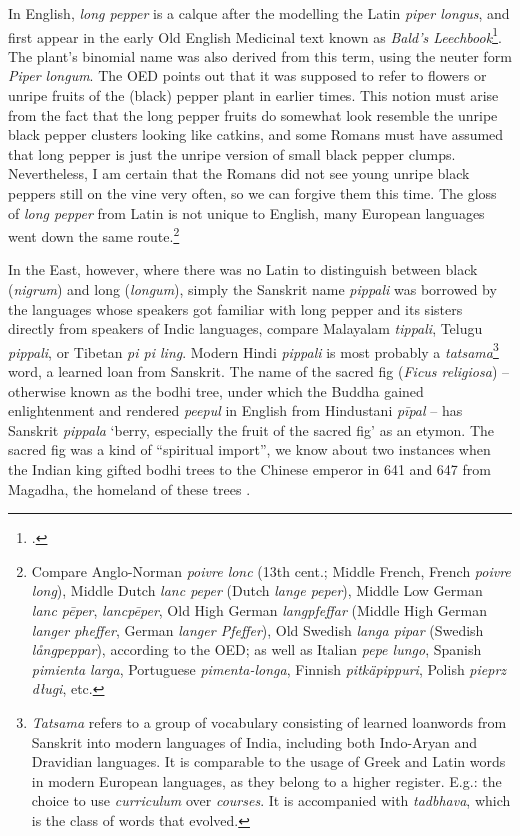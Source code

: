 



In English, \textit{long pepper} is a calque after the modelling the Latin \textit{piper longus}, and first appear in the early Old English Medicinal text known as \textit{Bald's Leechbook}\footcite[longpepper]{oed}. The plant's binomial name was also derived from this term, using the neuter form \textit{Piper longum}. The \gls{OED} points out that it was supposed to refer to flowers or unripe fruits of the (black) pepper plant in earlier times. This notion must arise from the fact that the long pepper fruits do somewhat look resemble the unripe black pepper clusters looking like catkins, and some Romans must have assumed that long pepper is just the unripe version of small black pepper clumps. Nevertheless, I am certain that the Romans did not see young unripe black peppers still on the vine very often, so we can forgive them this time. The gloss of \textit{long pepper} from Latin is not unique to English, many European languages went down the same route.\footnote{Compare Anglo-Norman \textit{poivre lonc} (13th cent.; Middle French, French \textit{poivre long}), Middle Dutch \textit{lanc peper} (Dutch \textit{lange peper}), Middle Low German \textit{lanc pēper}, \textit{lancpēper}, Old High German \textit{langpfeffar} (Middle High German \textit{langer pheffer}, German \textit{langer Pfeffer}), Old Swedish \textit{langa pipar} (Swedish \textit{långpeppar}), according to the OED; as well as Italian \textit{pepe lungo}, Spanish \textit{pimienta larga}, Portuguese \textit{pimenta-longa}, Finnish \textit{pitkäpippuri}, Polish \textit{pieprz długi}, etc.} 

In the East, however, where there was no Latin to distinguish between black (\textit{nigrum}) and long (\textit{longum}), simply the Sanskrit name \textit{pippali} was borrowed by the languages whose speakers got familiar with long pepper and its sisters directly from speakers of Indic languages, compare Malayalam \textit{tippali}, Telugu \textit{pippali}, or Tibetan \textit{pi pi ling}. Modern Hindi \textit{pippali} is most probably a \textit{tatsama}\footnote{\textit{Tatsama} refers to a group of vocabulary consisting of learned loanwords from Sanskrit into modern languages of India, including both Indo-Aryan and Dravidian languages. It is comparable to the usage of Greek and Latin words in modern European languages, as they belong to a higher register. E.g.: the choice to use \textit{curriculum} over \textit{courses}. It is accompanied with  \textit{tadbhava}, which is the class of words that evolved.} word, a learned loan from Sanskrit. The name of the sacred fig (\textit{Ficus religiosa}) -- otherwise known as the bodhi tree, under which the Buddha gained enlightenment and rendered \textit{peepul} in English from Hindustani \textit{p\={i}pal} -- has Sanskrit \textit{pippala} `berry, especially the fruit of the sacred fig' as an etymon. The sacred fig was a kind of ``spiritual import'', we know about two instances when the Indian king gifted bodhi trees to the Chinese emperor in 641 and 647 from Magadha, the homeland of these trees \parencite[122]{schafer_golden_1985}.

